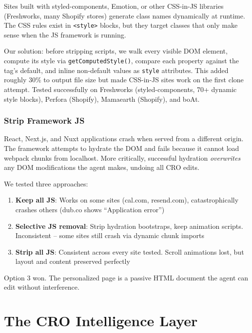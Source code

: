 \documentclass{article}
\begin{document}
Sites built with styled-components, Emotion, or other CSS-in-JS libraries (Freshworks, many Shopify stores) generate class names dynamically at runtime. The CSS rules exist in \texttt{<style>} blocks, but they target classes that only make sense when the JS framework is running.

Our solution: before stripping scripts, we walk every visible DOM element, compute its style via \texttt{getComputedStyle()}, compare each property against the tag's default, and inline non-default values as \texttt{style} attributes. This added roughly 30\% to output file size but made CSS-in-JS sites work on the first clone attempt. Tested successfully on Freshworks (styled-components, 70+ dynamic style blocks), Perfora (Shopify), Mamaearth (Shopify), and boAt.

\subsubsection{Strip Framework JS}

React, Next.js, and Nuxt applications crash when served from a different origin. The framework attempts to hydrate the DOM and fails because it cannot load webpack chunks from localhost. More critically, successful hydration \textit{overwrites} any DOM modifications the agent makes, undoing all CRO edits.

We tested three approaches:
\begin{enumerate}[leftmargin=2em]
    \item \textbf{Keep all JS}: Works on some sites (cal.com, resend.com), catastrophically crashes others (dub.co shows ``Application error'')
    \item \textbf{Selective JS removal}: Strip hydration bootstraps, keep animation scripts. Inconsistent -- some sites still crash via dynamic chunk imports
    \item \textbf{Strip all JS}: Consistent across every site tested. Scroll animations lost, but layout and content preserved perfectly
\end{enumerate}

Option 3 won. The personalized page is a passive HTML document the agent can edit without interference.

\section{The CRO Intelligence Layer}
\end{document}
